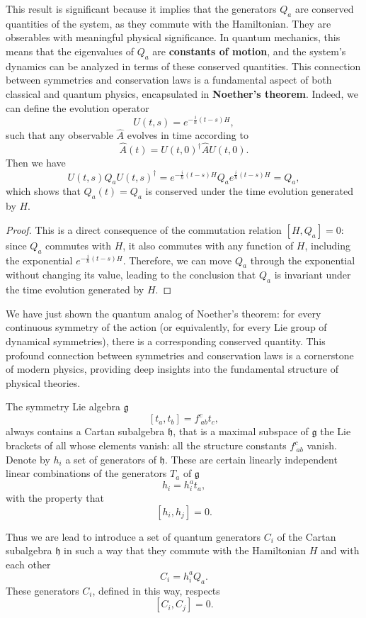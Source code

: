 This result is significant because it implies that the generators \(Q_a\) are conserved quantities of the system, as they commute with the Hamiltonian. They are obserables with meaningful physical significance. In quantum mechanics, this means that the eigenvalues of \(Q_a\) are \textbf{constants of motion}, and the system's dynamics can be analyzed in terms of these conserved quantities. This connection between symmetries and conservation laws is a fundamental aspect of both classical and quantum physics, encapsulated in \textbf{Noether's theorem}. Indeed, we can define the evolution operator
\[
    U(t,s) = e^{-\tfrac{i}{\hbar}(t-s)H},
\]
such that any observable \(\hat{A}\) evolves in time according to
\[
    \hat{A}(t) = U(t,0)^\dagger \hat{A} U(t,0).
\]
Then we have
\[
    U(t,s) Q_a U(t,s)^\dagger = e^{-\tfrac{i}{\hbar}(t-s)H} Q_a e^{\tfrac{i}{\hbar}(t-s)H} = Q_a,
\]
which shows that \(Q_a(t)=Q_a\) is conserved under the time evolution generated by \(H\).
\begin{proof}
    This is a direct consequence of the commutation relation \([H, Q_a] = 0\): since \(Q_a\) commutes with \(H\), it also commutes with any function of \(H\), including the exponential \(e^{-\tfrac{i}{\hbar}(t-s)H}\). Therefore, we can move \(Q_a\) through the exponential without changing its value, leading to the conclusion that \(Q_a\) is invariant under the time evolution generated by \(H\).
\end{proof}
We have just shown the quantum analog of Noether's theorem: for every continuous symmetry of the action (or equivalently, for every Lie group of dynamical symmetries), there is a corresponding conserved quantity. This profound connection between symmetries and conservation laws is a cornerstone of modern physics, providing deep insights into the fundamental structure of physical theories.

The symmetry Lie algebra \(\mathfrak{g}\)
\[
    [t_a, t_b] = f^c_{\ ab} t_c,
\]
always contains a Cartan subalgebra \(\mathfrak{h}\), that is a maximal subspace of \(\mathfrak{g}\) the Lie brackets of all whose elements vanish: all the structure constants \(f^c_{\ ab}\) vanish. Denote by \(h_i\) a set of generators of \(\mathfrak{h}\). These are certain linearly independent linear combinations of the generators \(T_a\) of \(\mathfrak{g}\)
\[
    h_i = h_i^a t_a,
\]
with the property that
\[
    [h_i, h_j] = 0.
\]

Thus we are lead to introduce a set of quantum generators \(C_i\) of the Cartan subalgebra \(\mathfrak{h}\) in such a way that they commute with the Hamiltonian \(H\) and with each other
\[
    C_i = h_i^a Q_a.
\]
These generators \(C_i\), defined in this way, respects
\[
    [C_i, C_j] = 0.
\]

